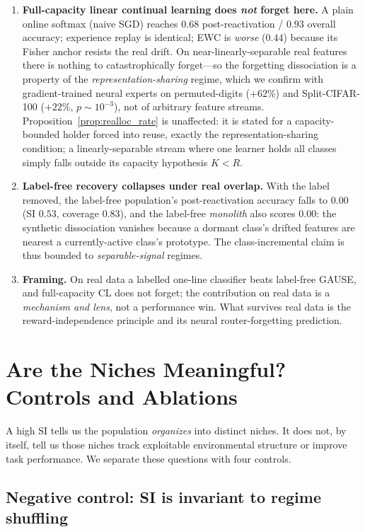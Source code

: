 \documentclass[11pt,a4paper]{article}
\theoremstyle{definition}
\theoremstyle{plain}
\begin{document}
\begin{enumerate}
\item \textbf{Full-capacity linear continual learning does \emph{not} forget here.}
A plain online softmax (naive SGD) reaches $0.68$ post-reactivation / $0.93$ overall
accuracy; experience replay is identical; EWC is \emph{worse} ($0.44$) because its
Fisher anchor resists the real drift. On near-linearly-separable real features there
is nothing to catastrophically forget---so the forgetting dissociation is a property
of the \emph{representation-sharing} regime, which we confirm with gradient-trained
neural experts on permuted-digits ($+62\%$) and Split-CIFAR-100 ($+22\%$,
$p\sim10^{-3}$), not of arbitrary feature streams. Proposition~\ref{prop:realloc_rate}
is unaffected: it is stated for a capacity-bounded holder forced into reuse, exactly
the representation-sharing condition; a linearly-separable stream where one learner
holds all classes simply falls outside its capacity hypothesis $K<R$.
\item \textbf{Label-free recovery collapses under real overlap.} With the label
removed, the label-free population's post-reactivation accuracy falls to $0.00$
(SI $0.53$, coverage $0.83$), and the label-free \emph{monolith} also scores $0.00$:
the synthetic dissociation vanishes because a dormant class's drifted features are
nearest a currently-active class's prototype. The class-incremental claim is thus
bounded to \emph{separable-signal} regimes.
\item \textbf{Framing.} On real data a labelled one-line classifier beats label-free
GAUSE, and full-capacity CL does not forget; the contribution on real data is a
\emph{mechanism and lens}, not a performance win. What survives real data is the
reward-independence principle and its neural router-forgetting prediction.
\end{enumerate}

\section{Are the Niches Meaningful? Controls and Ablations}
\label{ddsec:meaningfulness}

A high SI tells us the population \emph{organizes} into distinct niches. It does
not, by itself, tell us those niches track exploitable environmental structure or
improve task performance. We separate these questions with four controls.

\subsection{Negative control: SI is invariant to regime shuffling}
\end{document}
